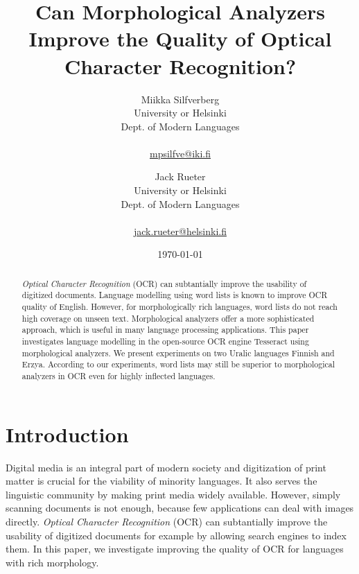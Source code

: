 \documentclass[b5paper]{article}
\begin{document}
\title{Can Morphological Analyzers Improve the Quality of Optical Character Recognition?}

\author{Miikka Silfverberg\\
University or Helsinki\\
Dept. of Modern Languages\\
\\
\url{mpsilfve@iki.fi} \and
Jack Rueter\\
University or Helsinki\\
Dept. of Modern Languages\\
\\
\url{jack.rueter@helsinki.fi} 
}

\date{\today}

\maketitle

\begin{abstract}
  {\it Optical Character Recognition} (OCR) can subtantially improve
  the usability of digitized documents. Language modelling using word
  lists is known to improve OCR quality of English. However, for
  morphologically rich languages, word lists do not reach high
  coverage on unseen text. Morphological analyzers offer a more
  sophisticated approach, which is useful in many language processing
  applications. This paper investigates language modelling in the
  open-source OCR engine Tesseract using morphological analyzers. We
  present experiments on two Uralic languages Finnish and
  Erzya. According to our experiments, word lists may still be
  superior to morphological analyzers in OCR even for highly inflected
  languages.
\end{abstract}

\section{Introduction}

Digital media is an integral part of modern society and digitization
of print matter is crucial for the viability of minority languages. It
also serves the linguistic community by making print media widely
available. However, simply scanning documents is not enough, because
few applications can deal with images directly. {\it Optical Character
  Recognition} (OCR) can subtantially improve the usability of
digitized documents for example by allowing search engines to index
them. In this paper, we investigate improving the quality of
OCR for languages with rich morphology.
\end{document}
